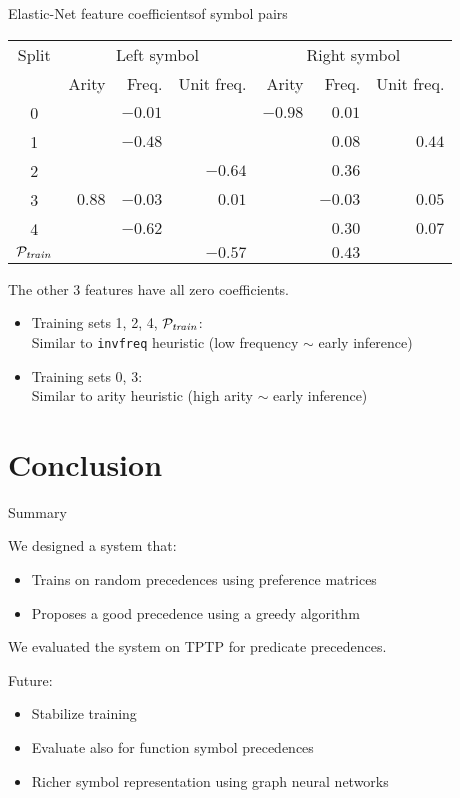 \documentclass{beamer}
\begin{document}
\begin{frame}{Elastic-Net feature coefficients}{of symbol pairs}
\begin{table}
\begin{tabular}{c|rrr|rrr}
	Split & \multicolumn{3}{c}{Left symbol} & \multicolumn{3}{c}{Right symbol} \\
	& Arity & Freq. & Unit freq. & Arity & Freq. & Unit freq. \\
	\hline
	0 &       &$-0.01$&       &$-0.98$&$ 0.01$&        \\
	1 &       &$-0.48$&       &       &$ 0.08$&$ 0.44 $\\
	2 &       &       &$-0.64$&       &$ 0.36$&        \\
	3 &$ 0.88$&$-0.03$&$ 0.01$&       &$-0.03$&$ 0.05 $\\
	4 &       &$-0.62$&       &       &$ 0.30$&$ 0.07 $\\
	\hline
	\(\mathcal{P}_{\mathit{train}}\) &       &       &$-0.57$&       &$ 0.43$&        \\
\end{tabular}
\end{table}

The other 3 features have all zero coefficients.

\begin{itemize}
	\item Training sets 1, 2, 4, $\mathcal{P}_{\mathit{train}}$: \\
	Similar to \texttt{invfreq} heuristic
	(low frequency $\sim$ early inference)
	\item Training sets 0, 3: \\
	Similar to arity heuristic (high arity $\sim$ early inference)
\end{itemize}
\end{frame}

\section{Conclusion}

\begin{frame}{Summary}

We designed a system that:

\begin{itemize}
	\item Trains on random precedences using preference matrices
	\item Proposes a good precedence using a greedy algorithm
\end{itemize}

We evaluated the system on TPTP for predicate precedences.

\vspace{.5cm}

Future:
\begin{itemize}
	\item Stabilize training
	\item Evaluate also for function symbol precedences
	\item Richer symbol representation using graph neural networks
\end{itemize}

\end{frame}
\end{document}
